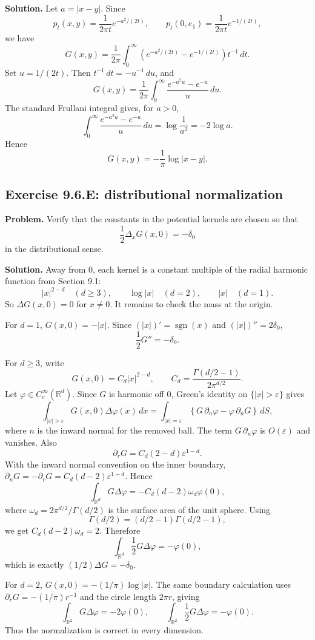 \documentclass[11pt]{article}
\newcommand{\R}{\mathbb{R}}
\newcommand{\dd}{\,d}
\newcommand{\Del}{\Delta}
\begin{document}
\noindent\textbf{Solution.}
Let $a=|x-y|$.  Since
\[
  p_t(x,y)=\frac1{2\pi t}e^{-a^2/(2t)},
  \qquad
  p_t(0,e_1)=\frac1{2\pi t}e^{-1/(2t)},
\]
we have
\[
  G(x,y)
  =
  \frac1{2\pi}\int_0^\infty
  \left(e^{-a^2/(2t)}-e^{-1/(2t)}\right)t^{-1}\dd t.
\]
Set $u=1/(2t)$.  Then $t^{-1}\dd t=-u^{-1}\dd u$, and
\[
  G(x,y)
  =
  \frac1{2\pi}\int_0^\infty
  \frac{e^{-a^2u}-e^{-u}}{u}\dd u.
\]
The standard Frullani integral gives, for $a>0$,
\[
  \int_0^\infty \frac{e^{-a^2u}-e^{-u}}{u}\dd u
  =
  \log\frac1{a^2}
  =
  -2\log a.
\]
Hence
\[
  G(x,y)=-\frac1\pi\log|x-y|.
\]

\subsection*{Exercise 9.6.E: distributional normalization}

\noindent\textbf{Problem.}
Verify that the constants in the potential kernels are chosen so that
\[
  \frac12\Del_xG(x,0)=-\delta_0
\]
in the distributional sense.

\noindent\textbf{Solution.}
Away from $0$, each kernel is a constant multiple of the radial
harmonic function from Section 9.1:
\[
  |x|^{2-d}\quad(d\ge3),\qquad
  \log|x|\quad(d=2),\qquad
  |x|\quad(d=1).
\]
So $\Del G(x,0)=0$ for $x\ne0$.  It remains to check the mass at the
origin.

For $d=1$, $G(x,0)=-|x|$.  Since $(|x|)'=\operatorname{sgn}(x)$ and
$(|x|)''=2\delta_0$,
\[
  \frac12G''=-\delta_0.
\]

For $d\ge3$, write
\[
  G(x,0)=C_d|x|^{2-d},
  \qquad
  C_d=\frac{\Gamma(d/2-1)}{2\pi^{d/2}}.
\]
Let $\varphi\in C_c^\infty(\R^d)$.  Since $G$ is harmonic off $0$,
Green's identity on $\{|x|>\varepsilon\}$ gives
\[
  \int_{|x|>\varepsilon}G(x,0)\Del\varphi(x)\dd x
  =
  \int_{|x|=\varepsilon}
  \left\{G\,\partial_n\varphi-\varphi\,\partial_nG\right\}\dd S,
\]
where $n$ is the inward normal for the removed ball.  The term
$G\,\partial_n\varphi$ is $O(\varepsilon)$ and vanishes.  Also
\[
  \partial_rG=C_d(2-d)\varepsilon^{1-d}.
\]
With the inward normal convention on the inner boundary,
$\partial_nG=-\partial_rG=C_d(d-2)\varepsilon^{1-d}$.  Hence
\[
  \int_{\R^d}G\Del\varphi
  =
  -C_d(d-2)\omega_d\varphi(0),
\]
where $\omega_d=2\pi^{d/2}/\Gamma(d/2)$ is the surface area of the unit
sphere.  Using
\[
  \Gamma(d/2)=(d/2-1)\Gamma(d/2-1),
\]
we get $C_d(d-2)\omega_d=2$.  Therefore
\[
  \int_{\R^d}\frac12G\Del\varphi=-\varphi(0),
\]
which is exactly $(1/2)\Del G=-\delta_0$.

For $d=2$, $G(x,0)=-(1/\pi)\log|x|$.  The same boundary calculation
uses $\partial_rG=-(1/\pi)r^{-1}$ and the circle length $2\pi r$,
giving
\[
  \int_{\R^2}G\Del\varphi=-2\varphi(0),
  \qquad
  \int_{\R^2}\frac12G\Del\varphi=-\varphi(0).
\]
Thus the normalization is correct in every dimension.
\end{document}
